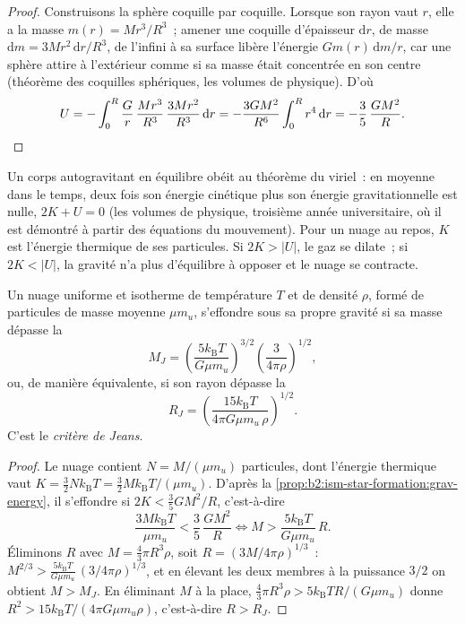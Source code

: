 \begin{proof}
Construisons la sphère coquille par coquille. Lorsque son rayon vaut $r$, elle a la
masse $m(r) = M r^3/R^3$~; amener une coquille d'épaisseur $\mathrm dr$, de masse $\mathrm dm = 3M r^2\,\mathrm dr/R^3$, de l'infini à sa surface libère l'énergie
$G m(r)\,\mathrm dm/r$, car une sphère attire à l'extérieur comme si sa masse était concentrée en son centre (théorème des coquilles sphériques, les volumes de
physique).
D'où
\[
  U = -\int_0^R \frac{G}{r}\,\frac{M r^3}{R^3}\,\frac{3 M r^2}{R^3}\,\mathrm dr
    = -\frac{3 G M^2}{R^6}\int_0^R r^4\,\mathrm dr = -\frac{3}{5}\,\frac{G M^2}{R}.
  \qedhere
\]
\end{proof}

Un corps autogravitant en équilibre obéit au théorème du viriel~: en moyenne dans le
temps, deux fois son énergie cinétique plus son énergie gravitationnelle est nulle, $2K + U = 0$ (les volumes de physique, troisième année universitaire, où il est démontré
à partir des équations du mouvement). Pour un nuage au repos, $K$ est l'énergie thermique de ses particules. Si $2K > |U|$, le gaz se dilate~; si $2K < |U|$, la gravité n'a plus d'équilibre à opposer et le
nuage
se
contracte.

\begin{proposition}\label{prop:b2:ism-star-formation:jeans}
Un nuage uniforme et isotherme de température $T$ et de densité $\rho$, formé de
particules de masse moyenne $\mu m_u$, s'effondre sous sa propre gravité si sa masse dépasse la \emph{}
\[
  M_J = \left(\frac{5 k_{\mathrm B} T}{G\mu m_u}\right)^{3/2}
        \left(\frac{3}{4\pi\rho}\right)^{1/2},
\]
ou, de manière équivalente, si son rayon dépasse la \emph{}
\[
  R_J = \left(\frac{15 k_{\mathrm B} T}{4\pi G\mu m_u\,\rho}\right)^{1/2}.
\]
C'est le \emph{critère de Jeans}.
\end{proposition}

\begin{proof}
Le nuage contient $N = M/(\mu m_u)$ particules, dont l'énergie thermique vaut
$K = \tfrac32 N k_{\mathrm B}T = \tfrac32 M k_{\mathrm B}T/(\mu m_u)$. D'après la \cref{prop:b2:ism-star-formation:grav-energy}, il s'effondre si
$2K < \tfrac35 GM^2/R$,
c'est-à-dire
\[
  \frac{3 M k_{\mathrm B} T}{\mu m_u} < \frac{3}{5}\,\frac{G M^2}{R}
  \iff M > \frac{5 k_{\mathrm B} T}{G \mu m_u}\, R .
\]
Éliminons $R$ avec $M = \tfrac43\pi R^3\rho$, soit $R = (3M/4\pi\rho)^{1/3}$~:
$M^{2/3} > \frac{5 k_{\mathrm B}T}{G\mu m_u}\,(3/4\pi\rho)^{1/3}$, et en élevant les deux membres
à la puissance $3/2$ on obtient $M > M_J$. En éliminant $M$ à la place,
$\tfrac43\pi R^3\rho > 5 k_{\mathrm B}T R/(G\mu m_u)$ donne $R^2 > 15
k_{\mathrm B}T/(4\pi G\mu m_u\rho)$, c'est-à-dire $R > R_J$.
\end{proof}

